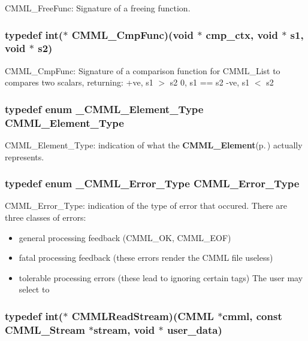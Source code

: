 CMML\_\-Free\-Func: Signature of a freeing function. 
\subsubsection{\setlength{\rightskip}{0pt plus 5cm}typedef int($\ast$ {\bf CMML\_\-Cmp\-Func})(void $\ast$ cmp\_\-ctx, void $\ast$ s1, void $\ast$ s2)}\label{cmml_8h_a5}


CMML\_\-Cmp\-Func: Signature of a comparison function for CMML\_\-List to compares two scalars, returning: +ve, s1 $>$ s2 0, s1 == s2 -ve, s1 $<$ s2 
\subsubsection{\setlength{\rightskip}{0pt plus 5cm}typedef enum {\bf \_\-CMML\_\-Element\_\-Type}  {\bf CMML\_\-Element\_\-Type}}\label{cmml_8h_a6}


CMML\_\-Element\_\-Type: indication of what the {\bf CMML\_\-Element}{\rm (p.\,\pageref{structCMML__Element})} actually represents. 
\subsubsection{\setlength{\rightskip}{0pt plus 5cm}typedef enum {\bf \_\-CMML\_\-Error\_\-Type}  {\bf CMML\_\-Error\_\-Type}}\label{cmml_8h_a7}


CMML\_\-Error\_\-Type: indication of the type of error that occured. There are three classes of errors:\begin{itemize}
\item general processing feedback (CMML\_\-OK, CMML\_\-EOF)\item fatal processing feedback (these errors render the CMML file useless)\item tolerable processing errors (these lead to ignoring certain tags) The user may select to \end{itemize}
\subsubsection{\setlength{\rightskip}{0pt plus 5cm}typedef int($\ast$ {\bf CMMLRead\-Stream})({\bf CMML} $\ast$cmml, const {\bf CMML\_\-Stream} $\ast$stream, void $\ast$ user\_\-data)}\label{cmml_8h_a8}



